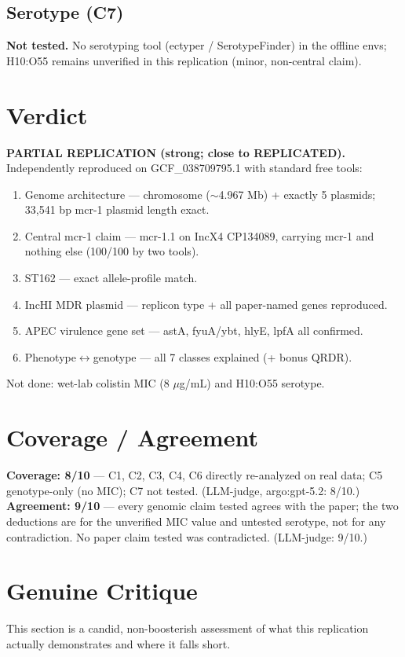 \documentclass[11pt,letterpaper]{article}
\begin{document}
\subsection{Serotype (C7)}
\textbf{Not tested.} No serotyping tool (ectyper / SerotypeFinder) in the offline
envs; H10:O55 remains unverified in this replication (minor, non-central claim).

\section{Verdict}
\textbf{PARTIAL REPLICATION (strong; close to REPLICATED).} Independently
reproduced on GCF\_038709795.1 with standard free tools:
\begin{enumerate}[leftmargin=1.5em]
  \item Genome architecture --- chromosome ($\sim$4.967 Mb) + exactly 5 plasmids; 33{,}541 bp mcr-1 plasmid length exact.
  \item Central mcr-1 claim --- mcr-1.1 on IncX4 CP134089, carrying mcr-1 and nothing else (100/100 by two tools).
  \item ST162 --- exact allele-profile match.
  \item IncHI MDR plasmid --- replicon type + all paper-named genes reproduced.
  \item APEC virulence gene set --- astA, fyuA/ybt, hlyE, lpfA all confirmed.
  \item Phenotype$\leftrightarrow$genotype --- all 7 classes explained (+ bonus QRDR).
\end{enumerate}
Not done: wet-lab colistin MIC (8 $\mu$g/mL) and H10:O55 serotype.

\section{Coverage / Agreement}
\textbf{Coverage: 8/10} --- C1, C2, C3, C4, C6 directly re-analyzed on real data;
C5 genotype-only (no MIC); C7 not tested. (LLM-judge, argo:gpt-5.2: 8/10.)
\textbf{Agreement: 9/10} --- every genomic claim tested agrees with the paper;
the two deductions are for the unverified MIC value and untested serotype, not
for any contradiction. No paper claim tested was contradicted.
(LLM-judge: 9/10.)

\section{Genuine Critique}
This section is a candid, non-boosterish assessment of what this replication
actually demonstrates and where it falls short.
\end{document}
